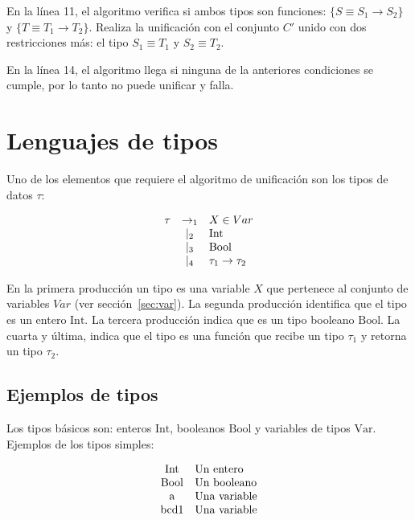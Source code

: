 \documentclass{article}
\begin{document}
En la línea 11, el algoritmo verifica si ambos tipos son funciones:
$\{S \equiv S_1 \to S_2\}$ y $\{T \equiv T_1 \to T_2\}$. Realiza la
unificación con el conjunto $C'$ unido con dos restricciones más: el
tipo $S_1 \equiv T_1$ y $S_2 \equiv T_2$.

En la línea 14, el algoritmo llega si ninguna de la anteriores
condiciones se cumple, por lo tanto no puede unificar y falla.

\section{Lenguajes de tipos}\label{sec:lenguajetipos}

Uno de los elementos que requiere el algoritmo de unificación
son los tipos de datos $\tau$:

\[
  \begin{array}[h]{rcl}
    \tau & \to_1  & X \in Var \\
         & \mid_2 & \text{Int} \\
         & \mid_3 & \text{Bool} \\
         & \mid_4 & \tau_1 \to \tau_2 \\
  \end{array}
\]

En la primera producción un tipo es una variable $X$ que pertenece al
conjunto de variables $Var$ (ver sección~\ref{sec:var}). La segunda
producción identifica que el tipo es un entero $\text{Int}$. La
tercera producción indica que es un tipo booleano $\text{Bool}$. La
cuarta y última, indica que el tipo es una función que recibe un tipo
$\tau_1$ y retorna un tipo $\tau_2$.

\subsection{Ejemplos de tipos}
\label{sec:ejemtipos}

Los tipos básicos son: enteros $\text{Int}$, booleanos $\text{Bool}$ y
variables de tipos $\text{Var}$. Ejemplos de los tipos simples:

\[
  \begin{array}[h]{cl}
    \text{Int} & \text{Un entero} \\
    \text{Bool} & \text{Un booleano} \\
    \text{a} & \text{Una variable} \\
    \text{bcd1} & \text{Una variable} \\
  \end{array}
\]
\end{document}
